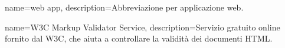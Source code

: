 {
	name=web app,
	description={Abbreviazione per applicazione web.}
}

{
	name=W3C Markup Validator Service,
	description={Servizio gratuito online fornito dal W3C, che aiuta a controllare la validità dei documenti HTML.}
}